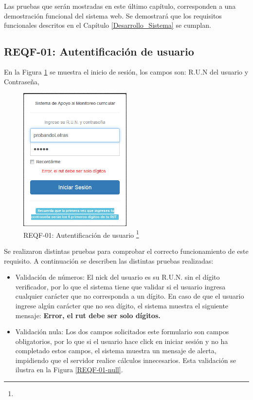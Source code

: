 Las pruebas que serán mostradas en este último capítulo, corresponden a una demostración funcional del sistema web.
Se demostrará que los requisitos funcionales descritos en el Capítulo \ref{Desarrollo_Sistema} se cumplan.
\subsection{REQF-01: Autentificación de usuario}


En la Figura \ref{REQF-01} se muestra el inicio de sesión, los campos son: R.U.N del usuario y
Contraseña,


	\begin{figure}[H]
		\centering
		\includegraphics[width=0.5\textwidth]{images/Capitulo_5/REQF-01.png}
		\caption[REQF-01: Autentificación de usuario]{REQF-01: Autentificación de usuario \footnote{}}
		\label{REQF-01}
	\end{figure}
	
	
	Se realizaron distintas pruebas para comprobar el correcto funcionamiento de este requisito. A continuación se describen las distintas pruebas realizadas:
	\begin{itemize}
		\item Validación de números: El nick del usuario es su R.U.N. sin el dígito verificador, por lo que el sistema tiene que validar si el usuario ingresa cualquier carácter que no corresponda a un dígito. En caso de que el usuario ingrese algún carácter que no sea dígito, el sistema muestra el siguiente mensaje: \textbf{Error, el rut debe ser solo dígitos.}
		
		\item Validación nula: Los  dos campos solicitados  este formulario son campos obligatorios, por lo que si el usuario hace click en iniciar sesión y no ha completado estos campos, el sistema muestra un mensaje de alerta, impidiendo que el servidor realice cálculos innecesarios. Esta validación se ilustra en la Figura \ref{REQF-01-null}.
	\end{itemize}
	
